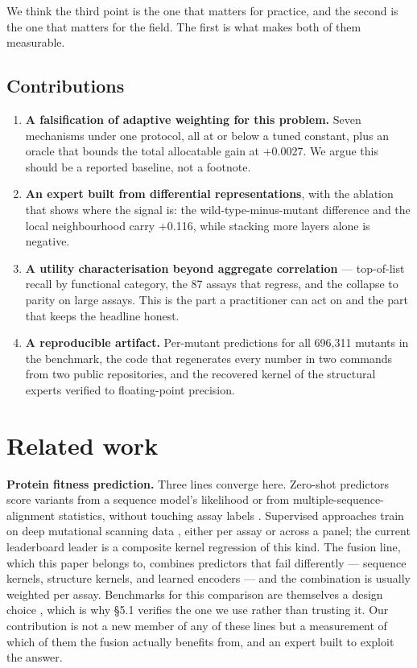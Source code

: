\documentclass{article}
\begin{document}
We think the third point is the one that matters for practice, and the second is the one that matters
for the field. The first is what makes both of them measurable.

\subsection*{Contributions}\label{contributions}

\begin{enumerate}
\def\labelenumi{\arabic{enumi}.}
\item
  \textbf{A falsification of adaptive weighting for this problem.} Seven mechanisms under one protocol, all
  at or below a tuned constant, plus an oracle that bounds the total allocatable gain at +0.0027. We
  argue this should be a reported baseline, not a footnote.
\item
  \textbf{An expert built from differential representations}, with the ablation that shows where the signal
  is: the wild-type-minus-mutant difference and the local neighbourhood carry +0.116, while stacking
  more layers alone is negative.
\item
  \textbf{A utility characterisation beyond aggregate correlation} --- top-of-list recall by functional
  category, the 87 assays that regress, and the collapse to parity on large assays. This is the part a
  practitioner can act on and the part that keeps the headline honest.
\item
  \textbf{A reproducible artifact.} Per-mutant predictions for all 696,311 mutants in the benchmark, the
  code that regenerates every number in two commands from two public repositories, and the recovered
  kernel of the structural experts verified to floating-point precision.
\end{enumerate}

\section{Related work}\label{related-work}

\textbf{Protein fitness prediction.} Three lines converge here. Zero-shot predictors score variants from a
sequence model's likelihood or from multiple-sequence-alignment statistics, without touching assay
labels \cite{esm1v,tranception,msatransformer}. Supervised approaches train on deep mutational scanning
data \cite{fowler2014,yang2019}, either per assay or across a panel; the current leaderboard leader is a
composite kernel regression of this kind. The fusion line, which this paper belongs to, combines
predictors that fail differently --- sequence kernels, structure kernels, and learned encoders --- and the
combination is usually weighted per assay. Benchmarks for this comparison are themselves a design
choice \cite{flip}, which is why \S5.1 verifies the one we use rather than trusting it. Our contribution is
not a new member of any of these lines but a measurement of which of them the fusion actually benefits
from, and an expert built to exploit the answer.
\end{document}
